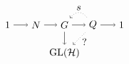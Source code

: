 \[
    \begin{gathered}
        \begin{tikzpicture}
            \node (A) at (-2, 0) {$1$};
            \node (B) at (-1, 0) {$N$};
            \draw[->] (A) -- (B);
            \node (C) at (0, 0) {$G$};
            \draw[->] (B) -- (C);
            \node (D) at (1, 0) {$Q$};
            \node (E) at (2, 0) {$1$};
            \draw[->, dotted]  (D) .. controls (0.6, 0.5) and (0.4, 0.5) .. (C) ;
            \node at (0.5, 0.6) {$s$};
            \draw[->] (C) -- (D);
            \draw[->] (D) -- (E);
            \node (F) at (0, -1) {$\mathrm{GL}(\mathcal{H})$};
            \draw[->] (C) -- (F);
            \draw[<-, dotted] (F) -- (D);
            \node at (0.7, -0.6) {?};
       \end{tikzpicture}
    \end{gathered}
\]
